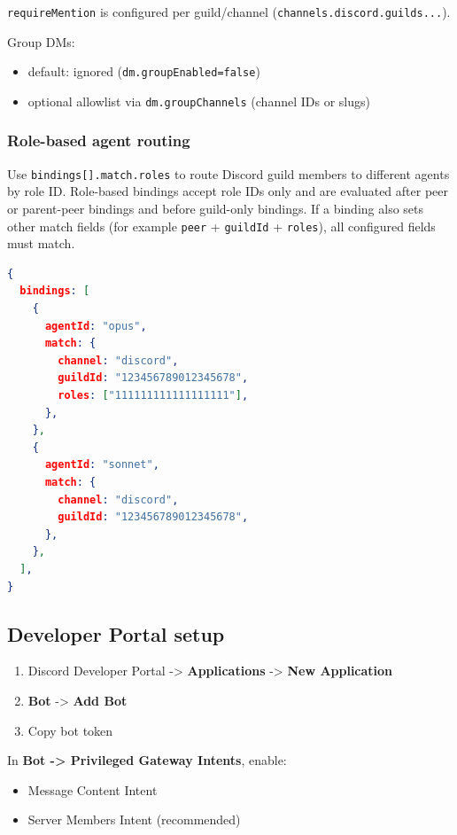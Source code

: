 \texttt{requireMention} is configured per guild/channel (\texttt{channels.discord.guilds...}).

Group DMs:

\begin{itemize}
  \item default: ignored (\texttt{dm.groupEnabled=false})
  \item optional allowlist via \texttt{dm.groupChannels} (channel IDs or slugs)
\end{itemize}



\subsubsection{Role-based agent routing}


Use \texttt{bindings[].match.roles} to route Discord guild members to different agents by role ID. Role-based bindings accept role IDs only and are evaluated after peer or parent-peer bindings and before guild-only bindings. If a binding also sets other match fields (for example \texttt{peer} + \texttt{guildId} + \texttt{roles}), all configured fields must match.

\begin{lstlisting}[language=json]
{
  bindings: [
    {
      agentId: "opus",
      match: {
        channel: "discord",
        guildId: "123456789012345678",
        roles: ["111111111111111111"],
      },
    },
    {
      agentId: "sonnet",
      match: {
        channel: "discord",
        guildId: "123456789012345678",
      },
    },
  ],
}
\end{lstlisting}


\subsection{Developer Portal setup}



\begin{enumerate}
  \item Discord Developer Portal -> \textbf{Applications} -> \textbf{New Application}
  \item \textbf{Bot} -> \textbf{Add Bot}
  \item Copy bot token
\end{enumerate}



In \textbf{Bot -> Privileged Gateway Intents}, enable:

\begin{itemize}
  \item Message Content Intent
  \item Server Members Intent (recommended)
\end{itemize}


